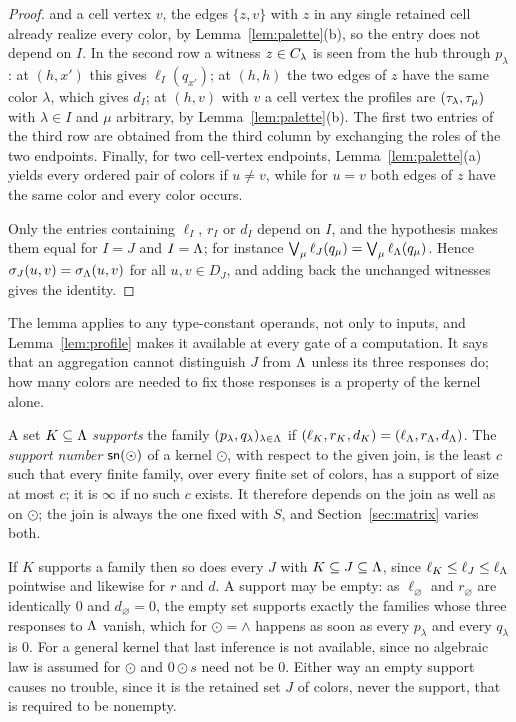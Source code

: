 \begin{proof}
and a cell vertex $v$, the edges $\{z,v\}$ with $z$ in any single retained
cell already realize every color, by Lemma~\ref{lem:palette}(b), so the
entry does not depend on $I$. In the second row a witness $z\in C_{\lambda}$
is seen from the hub through $p_\lambda$: at $(h,x')$ this gives
$\ell_I(q_{x'})$; at $(h,h)$ the two edges of $z$ have the same color
$\lambda$, which gives $d_I$; at $(h,v)$ with $v$ a cell vertex the profiles
are $(\tau_{\lambda},\tau_{\mu})$ with $\lambda\in I$ and $\mu$ arbitrary, by
Lemma~\ref{lem:palette}(b). The first two entries of the third row are
obtained from the third column by exchanging the roles of the two endpoints.
Finally, for two cell-vertex endpoints, Lemma~\ref{lem:palette}(a) yields
every ordered pair of colors if $u\ne v$, while for $u=v$ both edges of $z$
have the same color and every color occurs.

Only the entries containing $\ell_I$, $r_I$ or $d_I$ depend on $I$, and the
hypothesis makes them equal for $I=J$ and $I=\Lambda$; for instance
$\bigvee_\mu\ell_J(q_\mu)=\bigvee_\mu\ell_{\Lambda}(q_\mu)$. Hence
$\sigma_J(u,v)=\sigma_{\Lambda}(u,v)$ for all $u,v\in D_J$, and adding back the
unchanged witnesses gives the identity.
\end{proof}
The lemma applies to any type-constant operands, not only to inputs, and
Lemma~\ref{lem:profile} makes it available at every gate of a computation.
It says that an aggregation cannot distinguish $J$ from $\Lambda$ unless its
three responses do; how many colors are needed to fix those responses is a
property of the kernel alone.

\begin{definition}\label{def:width}
A set $K\subseteq\Lambda$ \emph{supports} the family
$(p_\lambda,q_\lambda)_{\lambda\in\Lambda}$ if
$(\ell_K,r_K,d_K)=(\ell_{\Lambda},r_{\Lambda},d_{\Lambda})$. The \emph{support number}
$\mathsf{sn}(\odot)$ of a kernel $\odot$, with respect to the given join, is
the least $c$ such that every finite family, over every finite set of
colors, has a support of size at most $c$; it is $\infty$ if no such $c$
exists. It therefore depends on the join as well as on $\odot$; the join is
always the one fixed with $S$, and Section~\ref{sec:matrix} varies both.
\end{definition}
If $K$ supports a family then so does every $J$ with
$K\subseteq J\subseteq\Lambda$, since $\ell_K\le\ell_J\le\ell_{\Lambda}$ pointwise
and likewise for $r$ and $d$. A support may be empty: as $\ell_\varnothing$
and $r_\varnothing$ are identically $0$ and $d_\varnothing=0$, the empty set
supports exactly the families whose three responses to $\Lambda$ vanish, which
for $\odot=\land$ happens as soon as every $p_\lambda$ and every $q_\lambda$
is $0$. For a general kernel that last inference is not available, since no
algebraic law is assumed for $\odot$ and $0\odot s$ need not be $0$. Either
way an empty support causes no trouble, since it is the retained set $J$ of
colors, never the support, that is required to be nonempty.

